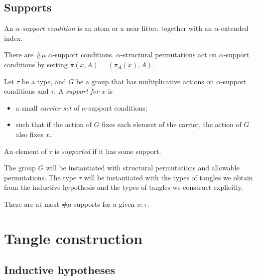 \documentclass{article}
\begin{document}
\subsection{Supports}

\begin{definition}
    An \emph{\( \alpha \)-support condition} is an atom or a near litter, together with an \( \alpha \)-extended index.
\end{definition}
\begin{lemma}
    There are \( \#\mu \) \( \alpha \)-support conditions.
    \( \alpha \)-structural permutations act on \( \alpha \)-support conditions by setting \( \pi(x, A) = (\pi_A(x), A) \).
\end{lemma}
\begin{definition}
    Let \( \tau \) be a type, and \( G \) be a group that has multiplicative actions on \( \alpha \)-support conditions and \( \tau \).
    A \emph{support for \( x \)} is
    \begin{itemize}
        \item a small \emph{carrier set} of \( \alpha \)-support conditions;
        \item such that if the action of \( G \) fixes each element of the carrier, the action of \( G \) also fixes \( x \).
    \end{itemize}
    An element of \( \tau \) is \emph{supported} if it has some support.
\end{definition}
\begin{remark}
    The group \( G \) will be instantiated with structural permutations and allowable permutations.
    The type \( \tau \) will be instantiated with the types of tangles we obtain from the inductive hypothesis and the types of tangles we construct explicitly.
\end{remark}
\begin{lemma}
    There are at most \( \#\mu \) supports for a given \( x : \tau \).
\end{lemma}

\section{Tangle construction}

\subsection{Inductive hypotheses}
\end{document}
